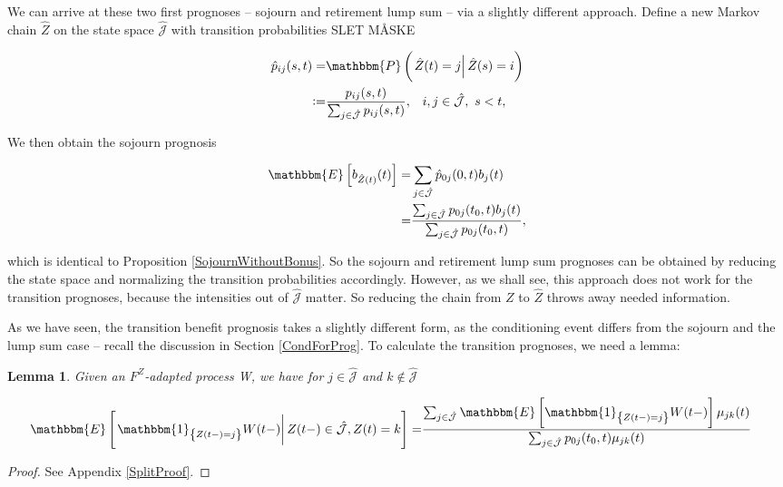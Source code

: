 \documentclass{article}
\newcommand{\1}[1]{\mathbbm{1}_{\left\lbrace #1 \right\rbrace}}
\newcommand{\expec}[1][def]{\mathbbm{E} \left[ #1 \right]}
\newcommand{\econd}[2][def]{\mathbbm{E} \left[ \left. #1 \right| #2 \right]}
\newcommand{\pcond}[2][def]{\mathbbm{P} \left( \left. #1 \right| #2 \right)}
\theoremstyle{break}
\newtheorem{lemma}[definition]{Lemma}
\theoremstyle{remark}
\newenvironment{remark}
  {\pushQED{\qed}\renewcommand{\qedsymbol}{\scalebox{1.4}{$\circ$}}\remarkx}
  {\popQED\endremarkx}
\numberwithin{equation}{section}
\begin{document}
\begin{remark}[Reducing the state space] \label{ReducedStateSpace}
We can arrive at these two first prognoses -- sojourn and retirement lump sum -- via a slightly different approach. Define a new Markov chain $\hat{Z}$ on the state space $\hat{\mathcal{J}}$ with transition probabilities SLET MÅSKE

\begin{align*}
    \hat{p}_{ij}(s,t) =& \pcond[\hat{Z}(t) = j]{\hat{Z}(s) = i} \\
    :=& \frac{p_{ij}(s,t)}{\sum_{j \in \hat{\mathcal{J}}} p_{ij}(s,t)}, \, \, \, \, \, i,j \in \hat{\mathcal{J}}, \, \, s < t,
\end{align*}

We then obtain the sojourn prognosis

\begin{align*}
    \expec[b_{\hat{Z}(t)}(t)] =& \sum_{j \in \hat{\mathcal{J}}} \hat{p}_{0j}(0,t) b_j(t) \\
    =& \frac{\sum_{j \in \hat{\mathcal{J}}} p_{0j}(t_0,t) b_j(t)}{\sum_{j \in \hat{\mathcal{J}}} p_{0j}(t_0,t)},
\end{align*}

which is identical to Proposition \ref{SojournWithoutBonus}. So the sojourn and retirement lump sum prognoses can be obtained by reducing the state space and normalizing the transition probabilities accordingly. However, as we shall see, this approach does not work for the transition prognoses, because the intensities out of $\hat{\mathcal{J}}$ matter. So reducing the chain from $Z$ to $\hat{Z}$ throws away needed information.
\end{remark}

As we have seen, the transition benefit prognosis takes a slightly different form, as the conditioning event differs from the sojourn and the lump sum case -- recall the discussion in Section \ref{CondForProg}. To calculate the transition prognoses, we need a lemma:

\begin{lemma} \label{Split}
	Given an $F^Z$-adapted process W, we have for $j \in \hat{\mathcal{J}}$ and $k \notin \hat{\mathcal{J}}$
	
	\begin{align*}
		\econd[\1{Z(t-)=j} W(t-)]{Z(t-) \in \hat{\mathcal{J}}, Z(t) = k} =& \frac{\sum_{j \in \hat{\mathcal{J}}} \expec[\1{Z(t-)=j} W(t-)] \mu_{jk}(t)}{\sum_{j \in \hat{\mathcal{J}}} p_{0j}(t_0,t) \mu_{jk}(t)}
	\end{align*}
\end{lemma}
\begin{proof}
	See Appendix \ref{SplitProof}.
\end{proof}
\end{document}
